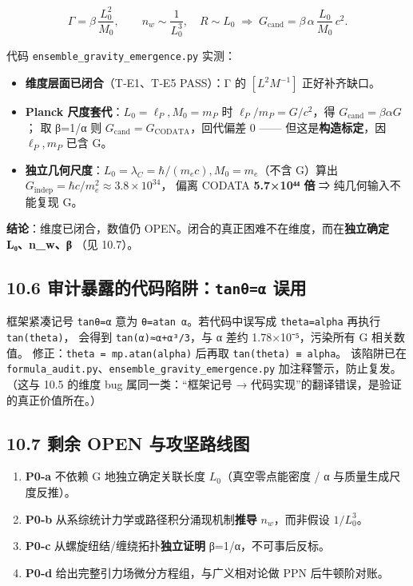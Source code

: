 \[
\Gamma = \beta\,\frac{L_0^{2}}{M_0}, \qquad n_w\sim\frac{1}{L_0^{3}},\quad R\sim L_0
\;\Rightarrow\;
G_{\text{cand}} = \beta\,\alpha\,\frac{L_0}{M_0}\,c^{2}.
\]

代码 \texttt{ensemble\_gravity\_emergence.py} 实测：

\begin{itemize}
\tightlist
\item
  \textbf{维度层面已闭合}（T‑E1、T‑E5 PASS）：Γ 的 \([L^2 M^{-1}]\)
  正好补齐缺口。
\item
  \textbf{Planck 尺度套代}：\(L_0=\ell_P, M_0=m_P\) 时
  \(\ell_P/m_P=G/c^2\)，得 \(G_{\text{cand}}=\beta\alpha G\)； 取 β=1/α
  则 \(G_{\text{cand}}=G_{\text{CODATA}}\)，回代偏差 0 ------
  但这是\textbf{构造标定}，因 \(\ell_P,m_P\) 已含 G。
\item
  \textbf{独立几何尺度}：\(L_0=\lambda_C=\hbar/(m_e c), M_0=m_e\)（不含
  G）算出 \(G_{\text{indep}}=\hbar c/m_e^2\approx 3.8\times10^{34}\)，
  偏离 CODATA \textbf{5.7×10⁴⁴ 倍} ⇒ 纯几何输入不能复现 G。
\end{itemize}

\textbf{结论}：维度已闭合，数值仍
OPEN。闭合的真正困难不在维度，而在\textbf{独立确定 L₀、n\_w、β} （见
10.7）。

\subsection{\texorpdfstring{10.6 审计暴露的代码陷阱：\texttt{tanθ=α}
误用}{10.6 审计暴露的代码陷阱：tanθ=α 误用}}\label{ux5ba1ux8ba1ux66b4ux9732ux7684ux4ee3ux7801ux9677ux9631tanux3b8ux3b1-ux8befux7528}

框架紧凑记号 \texttt{tanθ=α} 意为 \texttt{θ=atan\ α}。若代码中误写成
\texttt{theta=alpha} 再执行 \texttt{tan(theta)}， 会得到
\texttt{tan(α)≈α+α³/3}，与 α 差约 1.78×10⁻⁵，污染所有 G 相关数值。
修正：\texttt{theta\ =\ mp.atan(alpha)} 后再取
\texttt{tan(theta)\ ≡\ alpha}。 该陷阱已在
\texttt{formula\_audit.py}、\texttt{ensemble\_gravity\_emergence.py}
加注释警示，防止复发。 （这与 10.5 的维度 bug 属同一类：``框架记号 →
代码实现''的翻译错误，是验证的真正价值所在。）

\subsection{10.7 剩余 OPEN
与攻坚路线图}\label{ux5269ux4f59-open-ux4e0eux653bux575aux8defux7ebfux56fe}

\begin{enumerate}
\def\labelenumi{\arabic{enumi}.}
\tightlist
\item
  \textbf{P0‑a} 不依赖 G 地独立确定关联长度 \(L_0\)（真空零点能密度 / α
  与质量生成尺度反推）。
\item
  \textbf{P0‑b} 从系综统计力学或路径积分涌现机制\textbf{推导}
  \(n_w\)，而非假设 \(1/L_0^3\)。
\item
  \textbf{P0‑c} 从螺旋纽结/缠绕拓扑\textbf{独立证明}
  β=1/α，不可事后反标。
\item
  \textbf{P0‑d} 给出完整引力场微分方程组，与广义相对论做 PPN
  后牛顿阶对账。
\end{enumerate}

